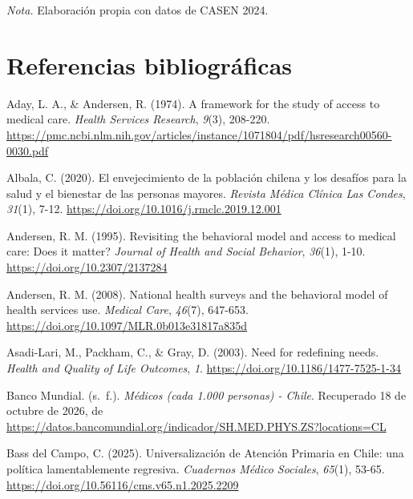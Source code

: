 \documentclass[
  spanish,
  a4paper,
  oneside]{scrbook}
\newlength{\cslhangindent}
\newenvironment{CSLReferences}[2] %
 {\begin{list}{}{%
  \setlength{\itemindent}{0pt}
  \setlength{\leftmargin}{0pt}
  \setlength{\parsep}{0pt}
  \ifodd #1
   \setlength{\leftmargin}{\cslhangindent}
   \setlength{\itemindent}{-1\cslhangindent}
  \fi
  \setlength{\itemsep}{#2\baselineskip}}}
 {\end{list}}
\begin{document}
\emph{Nota.} Elaboración propia con datos de CASEN 2024.


\chapter{Referencias
bibliográficas}\label{referencias-bibliogruxe1ficas}

\protect{}\label{refs}
\begin{CSLReferences}{1}{0}
Aday, L. A., \& Andersen, R. (1974). A framework for the study of access
to medical care. \emph{Health Services Research}, \emph{9}(3), 208-220.
\url{https://pmc.ncbi.nlm.nih.gov/articles/instance/1071804/pdf/hsresearch00560-0030.pdf}

Albala, C. (2020). El envejecimiento de la población chilena y los
desafíos para la salud y el bienestar de las personas mayores.
\emph{Revista Médica Clínica Las Condes}, \emph{31}(1), 7-12.
\url{https://doi.org/10.1016/j.rmclc.2019.12.001}

Andersen, R. M. (1995). Revisiting the behavioral model and access to
medical care: {Does} it matter? \emph{Journal of Health and Social
Behavior}, \emph{36}(1), 1-10. \url{https://doi.org/10.2307/2137284}

Andersen, R. M. (2008). National health surveys and the behavioral model
of health services use. \emph{Medical Care}, \emph{46}(7), 647-653.
\url{https://doi.org/10.1097/MLR.0b013e31817a835d}

Asadi-Lari, M., Packham, C., \& Gray, D. (2003). Need for redefining
needs. \emph{Health and Quality of Life Outcomes}, \emph{1}.
\url{https://doi.org/10.1186/1477-7525-1-34}

Banco Mundial. (s.~f.). \emph{Médicos (cada 1.000 personas) - {Chile}}.
Recuperado 18 de octubre de 2026, de
\url{https://datos.bancomundial.org/indicador/SH.MED.PHYS.ZS?locations=CL}

Bass del Campo, C. (2025). Universalización de Atención Primaria en
Chile: una política lamentablemente regresiva. \emph{Cuadernos Médico
Sociales}, \emph{65}(1), 53-65.
\url{https://doi.org/10.56116/cms.v65.n1.2025.2209}


\end{CSLReferences}
\end{document}
